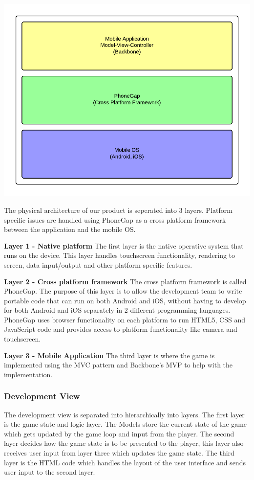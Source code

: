 \includegraphics[width=\textwidth]{pictures/physical_view}

The physical architecture of our product is seperated into 3 layers. Platform specific issues are handled 
using PhoneGap as a cross platform framework between the application and the mobile OS.

{\bf Layer 1 - Native platform}
The first layer is the native operative system that runs on the device. This layer handles touchscreen 
functionality, rendering to screen, data input/output and other platform specific features.

{\bf Layer 2 - Cross platform framework}
The cross platform framework is called PhoneGap. The purpose of this layer is to allow the development 
team to write portable code that can run on both Android and iOS, without having to develop for both 
Android and iOS separately in 2 different programming languages. PhoneGap uses browser functionality on 
each platform to run HTML5, CSS and JavaScript code and provides access to platform functionality like 
camera and touchscreen.

{\bf Layer 3 - Mobile Application}
The third layer is where the game is implemented using the MVC pattern and Backbone's MVP to help with
the implementation.


\subsubsection{Development View}
The development view is separated into hierarchically into layers. The first layer is the game state 
and logic layer. The Models store the current state of the game which gets updated by the game loop 
and input from the player. The second layer decides how the game state is to be presented to the 
player, this layer also receives user input from layer three which updates the game state. The third 
layer is the HTML code which handles the layout of the user interface and sends user input to the
second layer.

